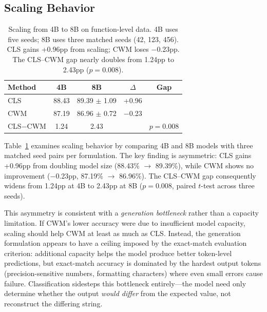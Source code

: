 \subsection{Scaling Behavior}
\label{ssec:scaling}


\begin{table}[t]
\centering
\small
\begin{tabular}{lcccc}
\toprule
\textbf{Method} & \textbf{4B} & \textbf{8B} & \textbf{$\Delta$} & \textbf{Gap} \\
\midrule
CLS & 88.43 & 89.39 $\pm$ 1.09 & +0.96 & \multirow{2}{*}{} \\
CWM & 87.19 & 86.96 $\pm$ 0.72 & $-$0.23 & \\
\midrule
CLS$-$CWM & 1.24 & 2.43 & & $p = 0.008$ \\
\bottomrule
\end{tabular}
\caption{Scaling from 4B to 8B on function-level data. 4B uses five seeds; 8B uses three matched seeds (42, 123, 456). CLS gains +0.96pp from scaling; CWM loses $-$0.23pp. The CLS--CWM gap nearly doubles from 1.24pp to 2.43pp ($p = 0.008$).}
\label{tab:scaling}
\end{table}

Table~\ref{tab:scaling} examines scaling behavior by comparing 4B and 8B models with three matched seed pairs per formulation.
The key finding is asymmetric: CLS gains +0.96pp from doubling model size (88.43\% $\to$ 89.39\%), while CWM shows no improvement ($-$0.23pp, 87.19\% $\to$ 86.96\%).
The CLS--CWM gap consequently widens from 1.24pp at 4B to 2.43pp at 8B ($p = 0.008$, paired $t$-test across three seeds).

This asymmetry is consistent with a \emph{generation bottleneck} rather than a capacity limitation.
If CWM's lower accuracy were due to insufficient model capacity, scaling should help CWM at least as much as CLS.
Instead, the generation formulation appears to have a ceiling imposed by the exact-match evaluation criterion: additional capacity helps the model produce better token-level predictions, but exact-match accuracy is dominated by the hardest output tokens (precision-sensitive numbers, formatting characters) where even small errors cause failure.
Classification sidesteps this bottleneck entirely---the model need only determine whether the output \emph{would differ} from the expected value, not reconstruct the differing string.


